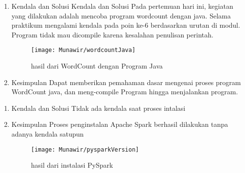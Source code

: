 \begin{enumerate}
\item Kendala dan Solusi
Kendala dan Solusi Pada pertemuan hari ini, kegiatan yang dilakukan adalah mencoba program wordcount dengan java. Selama praktikum mengalami kendala pada poin ke-6 berdasarkan urutan di modul. Program tidak mau dicompile karena kesalahan penulisan perintah.

\begin{figure}[!ht]
    \texttt{[image: Munawir/wordcountJava]}
    \caption{hasil dari WordCount dengan Program Java}
    \label{gam:perkuliahan-25-11}
    \end{figure}

\item Kesimpulan
Dapat memberikan pemahaman dasar mengenai proses program WordCount java, dan meng-compile Program hingga menjalankan program.

\end{enumerate}

\begin{enumerate}
\item Kendala dan Solusi
Tidak ada kendala saat proses intalasi

\item Kesimpulan
Proses penginstalan Apache Spark berhasil dilakukan tanpa
adanya kendala satupun

\begin{figure}[!ht]
    \texttt{[image: Munawir/pysparkVersion]}
    \caption{hasil dari instalasi PySpark}
    \label{gam:perkuliahan-25-11}
    \end{figure}

\end{enumerate}